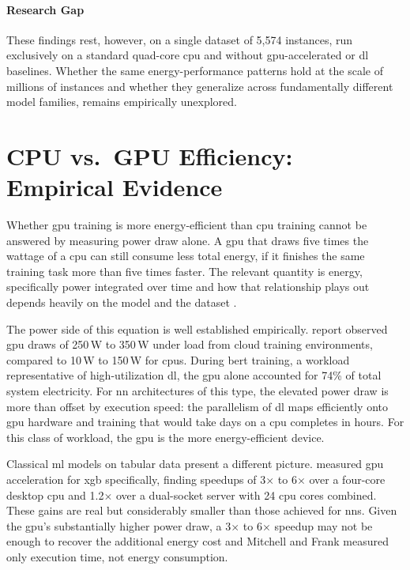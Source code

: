 \paragraph{Research Gap}
These findings rest, however, on a single dataset of 5{,}574 instances, run exclusively on a standard quad-core \gls{cpu} and without \gls{gpu}-accelerated or \gls{dl} baselines. Whether the same energy-performance patterns hold at the scale of millions of instances and whether they generalize across fundamentally different model families, remains empirically unexplored.

\section{CPU vs.\ GPU Efficiency: Empirical Evidence}
\label{sec:related_cpu_gpu}

Whether \gls{gpu} training is more energy-efficient than \gls{cpu} training cannot be answered by measuring power draw alone. A \gls{gpu} that draws five times the wattage of a \gls{cpu} can still consume less total energy, if it finishes the same training task more than five times faster. The relevant quantity is energy, specifically power integrated over time and how that relationship plays out depends heavily on the model and the dataset \cite{pattersonCarbonEmissionsLarge2021}.

The power side of this equation is well established empirically. \citeauthor{dodgeMeasuringCarbonIntensity2022} \cite{dodgeMeasuringCarbonIntensity2022} report observed \gls{gpu} draws of 250\,W to 350\,W under load from cloud training environments, compared to 10\,W to 150\,W for \glspl{cpu}. During \gls{bert} training, a workload representative of high-utilization \gls{dl}, the \gls{gpu} alone accounted for 74\% of total system electricity. For \gls{nn} architectures of this type, the elevated power draw is more than offset by execution speed: the parallelism of \gls{dl} maps efficiently onto \gls{gpu} hardware and training that would take days on a \gls{cpu} completes in hours. For this class of workload, the \gls{gpu} is the more energy-efficient device.

Classical \gls{ml} models on tabular data present a different picture. \citeauthor{mitchellAcceleratingXGBoostAlgorithm2017} \cite{mitchellAcceleratingXGBoostAlgorithm2017} measured \gls{gpu} acceleration for \gls{xgb} specifically, finding speedups of 3$\times$ to 6$\times$ over a four-core desktop \gls{cpu} and 1.2$\times$ over a dual-socket server with 24 \gls{cpu} cores combined. These gains are real but considerably smaller than those achieved for \glspl{nn}. Given the \gls{gpu}'s substantially higher power draw, a 3$\times$ to 6$\times$ speedup may not be enough to recover the additional energy cost and Mitchell and Frank measured only execution time, not energy consumption.


